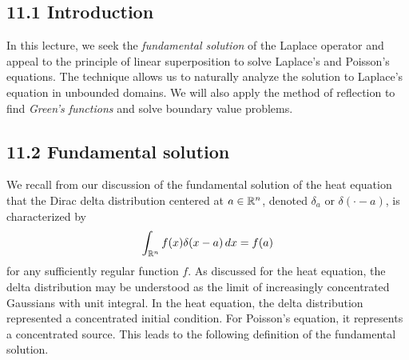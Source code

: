 
\providecommand{\mean}{\operatorname*{mean}}


\subsection{11.1 Introduction}
In this lecture, we seek the \textit{fundamental solution} of the Laplace operator and appeal to the principle of linear superposition to solve Laplace's and Poisson's equations. The technique allows us to naturally analyze the solution to Laplace's equation in unbounded domains. We will also apply the method of reflection to find \textit{Green's functions} and solve boundary value problems.

\subsection{11.2 Fundamental solution}
We recall from our discussion of the fundamental solution of the heat equation that the Dirac delta distribution centered at $a \in \mathbb{R}^n$, denoted $\delta_a$ or $\delta(\cdot - a)$, is characterized by
\[\int_{\mathbb{R}^n} f(x)\delta(x - a)\,dx = f(a)\]
for any sufficiently regular function $f$. As discussed for the heat equation, the delta distribution may be understood as the limit of increasingly concentrated Gaussians with unit integral. In the heat equation, the delta distribution represented a concentrated initial condition. For Poisson's equation, it represents a concentrated source. This leads to the following definition of the fundamental solution.

